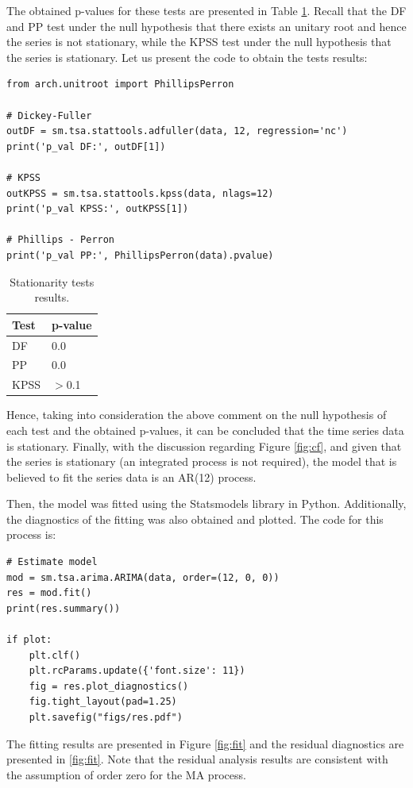 \documentclass[fleqn]{article}
\begin{document}
The obtained p-values for these tests are presented in Table \ref{tab:pvals}. Recall that the DF and PP test under the null hypothesis that there exists an unitary root and hence the series is not stationary, while the KPSS test under the null hypothesis that the series is stationary. Let us present the code to obtain the tests results:
\begin{verbatim}
from arch.unitroot import PhillipsPerron

# Dickey-Fuller
outDF = sm.tsa.stattools.adfuller(data, 12, regression='nc')
print('p_val DF:', outDF[1])

# KPSS
outKPSS = sm.tsa.stattools.kpss(data, nlags=12)
print('p_val KPSS:', outKPSS[1])

# Phillips - Perron
print('p_val PP:', PhillipsPerron(data).pvalue)
\end{verbatim}

\begin{table}[H]
\centering
\caption{Stationarity tests results.}
\label{tab:pvals}
\begin{tabular}{ll}
\hline
\textbf{Test} & \textbf{p-value} \\ \hline
DF & 0.0 \\
PP & 0.0 \\
KPSS & $>$0.1 \\ \hline
\end{tabular}
\end{table}

Hence, taking into consideration the above comment on the null hypothesis of each test and the obtained p-values, it can be concluded that the time series data is stationary. Finally, with the discussion regarding Figure \ref{fig:cf}, and given that the series is stationary (an integrated process is not required), the model that is believed to fit the series data is an AR(12) process.

Then, the model was fitted using the Statsmodels library in Python. Additionally, the diagnostics of the fitting was also obtained and plotted. The code for this process is:
\begin{verbatim}
# Estimate model
mod = sm.tsa.arima.ARIMA(data, order=(12, 0, 0))
res = mod.fit()
print(res.summary())

if plot:
    plt.clf()
    plt.rcParams.update({'font.size': 11})
    fig = res.plot_diagnostics()
    fig.tight_layout(pad=1.25)
    plt.savefig("figs/res.pdf")
\end{verbatim}

The fitting results are presented in Figure \ref{fig:fit} and the residual diagnostics are presented in \ref{fig:fit}. Note that the residual analysis results are consistent with the assumption of order zero for the MA process.
\end{document}
